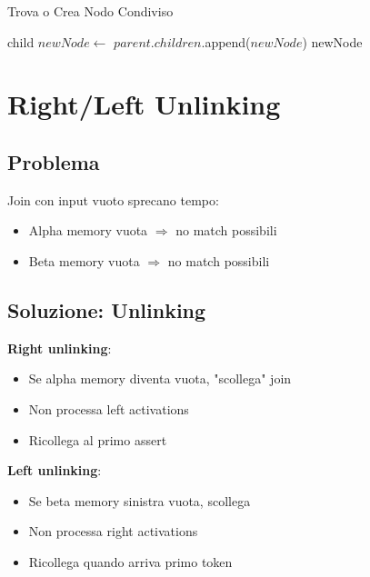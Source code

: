 \begin{algorithm}
\caption{Trova o Crea Nodo Condiviso}
\begin{algorithmic}[1]
      \State \Return child 
    \EndIf
  \EndFor
  \State $newNode \gets $ 
  \State $parent.children$.append($newNode$)
  \State \Return newNode
\EndFunction
\end{algorithmic}
\end{algorithm}

\section{Right/Left Unlinking}

\subsection{Problema}

Join con input vuoto sprecano tempo:

\begin{itemize}
\item Alpha memory vuota $\Rightarrow$ no match possibili
\item Beta memory vuota $\Rightarrow$ no match possibili
\end{itemize}

\subsection{Soluzione: Unlinking}

\textbf{Right unlinking}:
\begin{itemize}
\item Se alpha memory diventa vuota, "scollega" join
\item Non processa left activations
\item Ricollega al primo assert
\end{itemize}

\textbf{Left unlinking}:
\begin{itemize}
\item Se beta memory sinistra vuota, scollega
\item Non processa right activations
\item Ricollega quando arriva primo token
\end{itemize}

